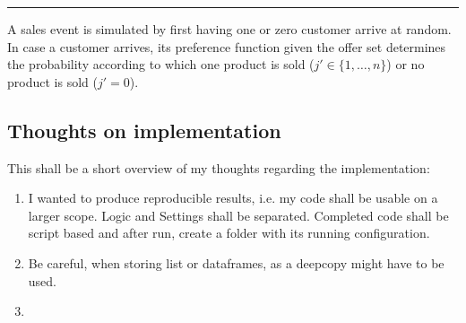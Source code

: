 \noindent\rule{\textwidth}{1pt}
A sales event is simulated by first having one or zero customer arrive at random. In case a customer arrives, its preference function given the offer set determines the probability according to which one product is sold ($j' \in \{1, \dots, n\}$) or no product is sold ($j' = 0$).



\subsection{Thoughts on implementation}

This shall be a short overview of my thoughts regarding the implementation:

\begin{enumerate}
	\item I wanted to produce reproducible results, i.e. my code shall be usable on a larger scope. Logic and Settings shall be separated. Completed code shall be script based and after run, create a folder with its running configuration.
	\item Be careful, when storing list or dataframes, as a deepcopy might have to be used.
	\item 
\end{enumerate}